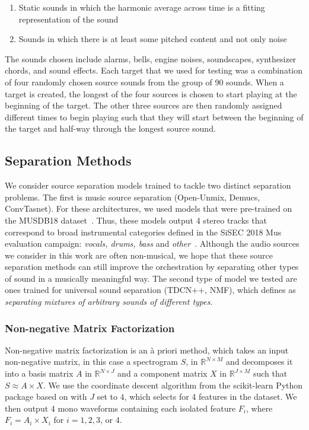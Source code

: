 \documentclass{article}
\begin{document}
		\begin{enumerate}
			\item Static sounds in which the harmonic average across time is a fitting representation of the sound
			\item Sounds in which there is at least some pitched content and not only noise
		\end{enumerate}			
		The sounds chosen include alarms, bells, engine noises, soundscapes, synthesizer chords, and sound effects. Each target that we used for testing was a combination of four randomly chosen source sounds from the group of 90 sounds. 
		When a target is created, the longest of the four sources is chosen to start playing at the beginning of the target. The other three sources are then randomly assigned different times to begin playing such that they will start between the beginning of the target and half-way through the longest source sound.
		
		\subsection{Separation Methods}
	We consider source separation models trained to tackle two distinct separation problems. The first is music source separation (Open-Unmix, Demucs, ConvTasnet). For these architectures, we used models that were pre-trained on the MUSDB18 dataset~\cite{MUSDB18}. Thus, these models output 4 stereo tracks that correspond to broad instrumental categories defined in the SiSEC 2018 Mus evaluation campaign: \textit{vocals, drums, bass} and \textit{other}~\cite{Stoter_SiSEC}. Although the audio sources we consider in this work are often non-musical, we hope that these source separation methods can still improve the orchestration by separating other types of sound in a musically meaningful way.
	The second type of model we tested are ones trained for universal sound separation (TDCN++, NMF), which \cite{tdcnpp} defines as \textit{separating mixtures of arbitrary sounds of different types}. 
	
			\subsubsection{Non-negative Matrix Factorization} 
			Non-negative matrix factorization \cite{Cichocki_NMF} \cite{Fevotte_NMF} is an \`a priori method, which takes an input non-negative matrix, in this case a spectrogram $S$, in $\mathbb{R} ^{N\times M}$ and decomposes it into a basis matrix $A$ in $\mathbb{R}^{N\times J}$ and a component matrix $X$ in $\mathbb{R}^{J\times M}$ such that $S\approx A\times X$. We use the coordinate descent algorithm from the scikit-learn Python package based on \cite{Cichocki_NMF} with $J$ set to $4$, which selects for 4 features in the dataset. We then output 4 mono waveforms containing each isolated feature $F_i$, where $F_i=A_i\times X_i$ for $i = 1, 2, 3$, or $4$.
			
\end{document}
